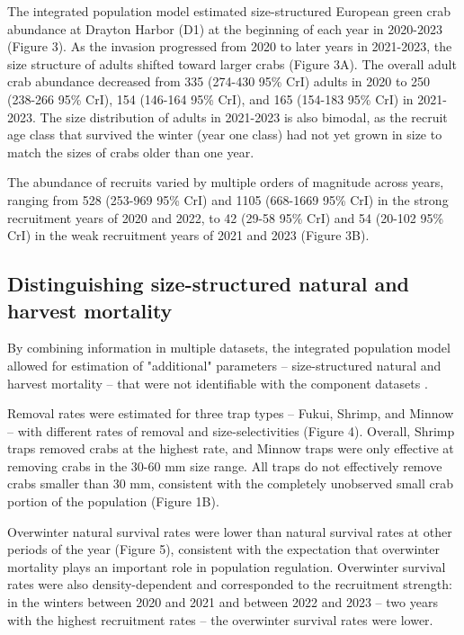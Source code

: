 \documentclass{article}
\begin{document}
The integrated population model estimated size-structured European green crab abundance at Drayton Harbor (D1) at the beginning of each year in 2020-2023 (Figure 3). As the invasion progressed from 2020 to later years in 2021-2023, the size structure of adults shifted toward larger crabs (Figure 3A). The overall adult crab abundance decreased from 335 (274-430 95\% CrI) adults in 2020 to 250 (238-266 95\% CrI), 154 (146-164 95\% CrI), and 165 (154-183 95\% CrI) in 2021-2023. The size distribution of adults in 2021-2023 is also bimodal, as the recruit age class that survived the winter (year one class) had not yet grown in size to match the sizes of crabs older than one year.

The abundance of recruits varied by multiple orders of magnitude across years, ranging from 528 (253-969 95\% CrI) and 1105 (668-1669 95\% CrI) in the strong recruitment years of 2020 and 2022, to 42 (29-58 95\% CrI) and 54 (20-102 95\% CrI) in the weak recruitment years of 2021 and 2023 (Figure 3B).

\subsection{Distinguishing size-structured natural and harvest mortality}

By combining information in multiple datasets, the integrated population model allowed for estimation of "additional" parameters -- size-structured natural and harvest mortality -- that were not identifiable with the component datasets \parencite{riecke2019integrated}.

Removal rates were estimated for three trap types -- Fukui, Shrimp, and Minnow -- with different rates of removal and size-selectivities (Figure 4). Overall, Shrimp traps removed crabs at the highest rate, and Minnow traps were only effective at removing crabs in the 30-60 mm size range. All traps do not effectively remove crabs smaller than 30 mm, consistent with the completely unobserved small crab portion of the population (Figure 1B).

Overwinter natural survival rates were lower than natural survival rates at other periods of the year (Figure 5), consistent with the expectation that overwinter mortality plays an important role in population regulation. Overwinter survival rates were also density-dependent and corresponded to the recruitment strength: in the winters between 2020 and 2021 and between 2022 and 2023 -- two years with the highest recruitment rates -- the overwinter survival rates were lower.
\end{document}
